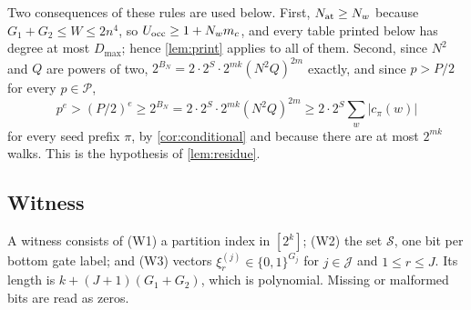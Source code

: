 \documentclass[11pt,letterpaper]{article}
\theoremstyle{definition}
\theoremstyle{remark}
\newcommand{\cP}{\mathcal P}
\newcommand{\cS}{\mathcal S}
\newcommand{\cJ}{\mathcal J}
\begin{document}
Two consequences of these rules are used below. First,
\(N_{\rm at}\ge N_w\) because \(G_1+G_2\le W\le2n^4\), so
\(U_{\rm occ}\ge1+N_wm_c\), and every table printed below has degree at
most \(D_{\max}\); hence \cref{lem:print} applies to all of them.
Second, since \(N^2\) and \(Q\) are powers of two,
\(2^{B_N}=2\cdot2^S\cdot2^{mk}(N^2Q)^{2m}\) exactly, and since
\(p>P/2\) for every \(p\in\cP\),
\[
 p^e>(P/2)^e\ge2^{B_N}=2\cdot2^S\cdot2^{mk}(N^2Q)^{2m}\ge2\cdot2^S\sum_{w}|c_\pi(w)|
\]
for every seed prefix \(\pi\), by \cref{cor:conditional} and because
there are at most \(2^{mk}\) walks. This is the hypothesis of
\cref{lem:residue}.

\subsection{Witness}
A witness consists of (W1) a partition index in \([2^k]\); (W2) the set
\(\cS\), one bit per bottom gate label; and (W3) vectors
\(\xi^{(j)}_r\in\{0,1\}^{G_j}\) for \(j\in\cJ\) and \(1\le r\le J\). Its
length is \(k+(J+1)(G_1+G_2)\), which is polynomial. Missing or
malformed bits are read as zeros.
\end{document}
